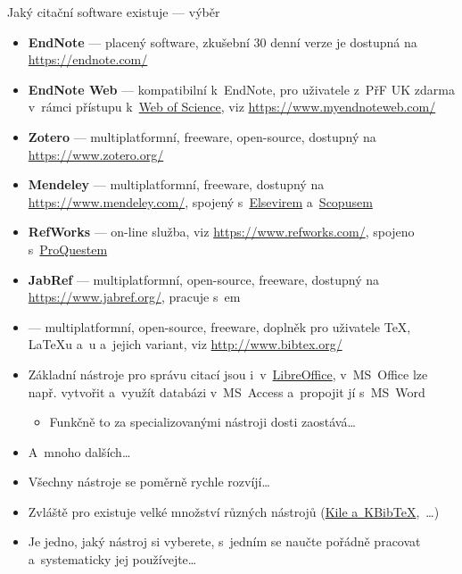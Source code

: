 \documentclass[compress, ucs, xelatex, 11pt, xcolor=svgnames, aspectratio=169,
	hyperref={
		bookmarks=true,
		unicode=true,
		colorlinks=true,
		pdftitle={Citacni software},
		plainpages=false,
		pdfauthor={Vojtech Zeisek},
		pdfsubject={Kratky uvod do citacniho software},
		pdfcreator={XeLaTeX},
		pdfkeywords={citace, reference, software, literatura},
		linkcolor=Crimson, %
		anchorcolor=Magenta, %
		citecolor=Magenta, %
		filecolor=Magenta, %
		menucolor=Magenta, %
		urlcolor=DarkTurquoise, %
		pdftex},
	url={hyphens, lowtilde} %
	]{beamer}
\begin{document}
\begin{frame}[allowframebreaks]{Jaký citační software existuje --- výběr}
	\begin{itemize}
		\item \textbf{EndNote} --- placený software, zkušební 30 denní verze je dostupná na \url{https://endnote.com/}
		\item \textbf{EndNote Web} --- kompatibilní k~EndNote, pro uživatele z~PřF UK zdarma v~rámci přístupu k~\href{https://apps.webofknowledge.com/}{Web of Science}, viz \url{https://www.myendnoteweb.com/}
		\item \textbf{Zotero} --- multiplatformní, freeware, open-source, dostupný na \url{https://www.zotero.org/}
		\item \textbf{Mendeley} --- multiplatformní, freeware, dostupný na \url{https://www.mendeley.com/}, spojený s~\href{https://www.elsevier.com/}{Elsevirem}  a~\href{https://www.scopus.com/}{Scopusem}
		\item \textbf{RefWorks} --- on-line služba, viz \url{https://www.refworks.com/}, spojeno s~\href{https://www.proquest.com/}{ProQuestem}
		\item \textbf{JabRef} --- multiplatformní, open-source, freeware, dostupný na \url{https://www.jabref.org/}, pracuje s~\BibTeX em
		\item \textbf{\BibTeX} --- multiplatformní, open-source, freeware, doplněk pro uživatele \TeX, \LaTeX u a~\XeLaTeX u a~jejich variant, viz \url{http://www.bibtex.org/}
		\item Základní nástroje pro správu citací jsou i~v~\href{https://www.openoffice.cz/navody/jak-vytvorit-a-upravovat-seznam-pouzite-literatury}{LibreOffice}, v~MS~Office lze např. vytvořit a~využít databázi v~MS~Access a~propojit jí s~MS~Word
		\begin{itemize}
			\item Funkčně to za specializovanými nástroji dosti zaostává\ldots
		\end{itemize}
		\item A~mnoho dalších\ldots
		\item Všechny nástroje se poměrně rychle rozvíjí\ldots
		\item Zvláště pro \BibTeX existuje velké množství různých nástrojů (\href{https://www.linuxexpres.cz/software/kile-a-kbibtex}{Kile a~KBibTeX},~\ldots)
		\item Je jedno, jaký nástroj si vyberete, s~jedním se naučte pořádně pracovat a~systematicky jej používejte\ldots
	\end{itemize}
\end{frame}
\end{document}
